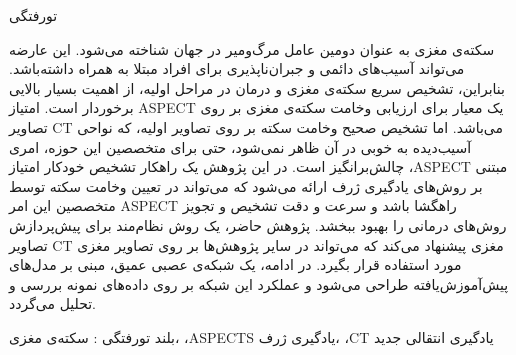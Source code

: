 


‌تورفتگی

سکته‌ی مغزی به عنوان دومین عامل مرگ‌و‌میر در جهان شناخته می‌شود.
این عارضه می‌تواند آسیب‌های دائمی و جبران‌ناپذیری برای افراد مبتلا به همراه داشته‌باشد.
بنابراین،
تشخیص سریع سکته‌ی مغزی و درمان در مراحل اولیه، از اهمیت بسیار بالایی برخوردار است.
امتیاز ASPECT یک معیار برای ارزیابی وخامت سکته‌ی مغزی بر روی تصاویر CT می‌باشد.
اما تشخیص صحیح وخامت سکته بر روی تصاویر اولیه، که نواحی آسیب‌دیده به خوبی در آن ظاهر نمی‌شود، حتی برای متخصصین این حوزه، امری چالش‌بر‌انگیز است.
 در این پژوهش 
یک راهکار تشخیص خودکار امتیاز ،ASPECT مبتنی بر روش‌های یادگیری ژرف ارائه می‌شود که می‌تواند
 در تعیین وخامت سکته توسط متخصصین این امر ASPECT راهگشا باشد و سرعت و دقت تشخیص و تجویز روش‌های درمانی را بهبود ببخشد.
پژوهش حاضر، یک روش نظام‌مند برای پیش‌پردازش تصاویر CT مغزی پیشنهاد می‌کند که می‌تواند در سایر پژوهش‌ها بر روی تصاویر مغزی مورد استفاده قرار بگیرد.
در ادامه، یک شبکه‌ی عصبی عمیق، مبنی بر مدل‌های پیش‌آموزش‌یافته طراحی می‌شود و  عملکرد این شبکه بر روی داده‌های نمونه بررسی و تحلیل می‌گردد.

‌بلند
‌تورفتگی : 
سکته‌ی مغزی، ،ASPECTS یادگیری ژرف، ،CT یادگیری انتقالی
‌جدید

